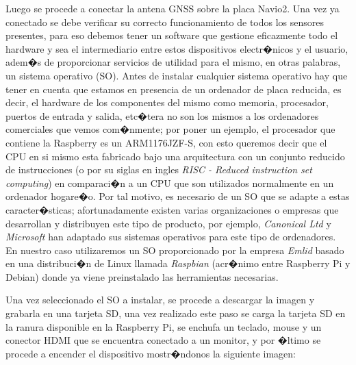 		Luego se procede a conectar la antena GNSS sobre la placa Navio2. Una vez ya conectado se debe verificar su correcto funcionamiento de todos los sensores presentes, para eso debemos tener un software que gestione eficazmente todo el hardware y sea el intermediario entre estos dispositivos electr�nicos y el usuario, adem�s de proporcionar servicios de utilidad para el mismo, en otras palabras, un sistema operativo (SO). Antes de instalar cualquier sistema operativo hay que tener en cuenta que  estamos en presencia de un ordenador de placa reducida, es decir, el hardware de los componentes del mismo como memoria, procesador, puertos de entrada y salida, etc�tera no son los mismos a los ordenadores comerciales que vemos com�nmente; por poner un ejemplo, el procesador que contiene la Raspberry es un ARM1176JZF-S, con esto queremos decir que el CPU en si mismo esta fabricado bajo una arquitectura con un conjunto reducido de instrucciones (o por su siglas en ingles \textit{RISC - Reduced instruction set computing}) en comparaci�n a un CPU que son utilizados normalmente en un ordenador hogare�o. Por tal motivo, es necesario de un SO que se adapte a estas caracter�sticas; afortunadamente existen varias organizaciones o empresas que desarrollan y distribuyen este tipo de producto, por ejemplo, \textit{Canonical Ltd} y \textit{Microsoft} han adaptado sus sistemas operativos para este tipo de ordenadores. En nuestro caso utilizaremos un SO proporcionado por la empresa \textit{Emlid} basado en una distribuci�n de Linux llamada \textit{Raspbian} (acr�nimo entre Raspberry Pi y Debian) donde ya viene preinstalado las herramientas necesarias.
		\par Una vez seleccionado el SO a instalar, se procede a descargar la imagen y grabarla en una tarjeta SD, una vez realizado este paso se carga la tarjeta SD en la ranura disponible en la Raspberry Pi, se enchufa un teclado, mouse y un conector HDMI que se encuentra conectado a un monitor, y por �ltimo se procede a encender el dispositivo  mostr�ndonos la siguiente imagen: 
		

